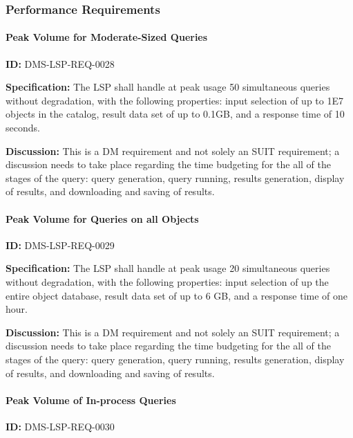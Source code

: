 \documentclass[SE,toc,lsstdraft]{lsstdoc}
\begin{document}
\subsubsection{Performance Requirements}

\paragraph{Peak Volume for Moderate-Sized Queries}\hfill  %

\label{DMS-LSP-REQ-0028}
\textbf{ID:} DMS-LSP-REQ-0028

\textbf{Specification:}
The LSP shall handle at peak usage 50 simultaneous queries without degradation, with the following properties: input selection of up to 1E7 objects in the catalog, result data set of up to 0.1GB, and a response time of 10 seconds.

\textbf{Discussion:}
This is a DM requirement and not solely an SUIT requirement; a discussion needs to take place regarding the time budgeting for the all of the stages of the query: query generation, query running, results generation, display of results, and downloading and saving of results.

\paragraph{Peak Volume for Queries on all Objects}\hfill  %

\label{DMS-LSP-REQ-0029}
\textbf{ID:} DMS-LSP-REQ-0029

\textbf{Specification:}
The LSP shall handle at peak usage 20 simultaneous queries without degradation, with the following properties: input selection of up the entire object database, result data set of up to 6 GB, and a response time of one hour.

\textbf{Discussion:}
This is a DM requirement and not solely an SUIT requirement; a discussion needs to take place regarding the time budgeting for the all of the stages of the query: query generation, query running, results generation, display of results, and downloading and saving of results.

\paragraph{Peak Volume of In-process Queries}\hfill  %

\label{DMS-LSP-REQ-0030}
\textbf{ID:} DMS-LSP-REQ-0030
\end{document}
